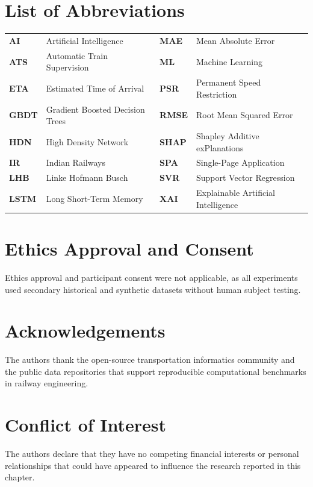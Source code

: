 \documentclass[11pt,a4paper]{article}
\begin{document}
\section*{List of Abbreviations}
\begin{tabular}{llll}
\textbf{AI} & Artificial Intelligence & \textbf{MAE} & Mean Absolute Error \\
\textbf{ATS} & Automatic Train Supervision & \textbf{ML} & Machine Learning \\
\textbf{ETA} & Estimated Time of Arrival & \textbf{PSR} & Permanent Speed Restriction \\
\textbf{GBDT} & Gradient Boosted Decision Trees & \textbf{RMSE} & Root Mean Squared Error \\
\textbf{HDN} & High Density Network & \textbf{SHAP} & Shapley Additive exPlanations \\
\textbf{IR} & Indian Railways & \textbf{SPA} & Single-Page Application \\
\textbf{LHB} & Linke Hofmann Busch & \textbf{SVR} & Support Vector Regression \\
\textbf{LSTM} & Long Short-Term Memory & \textbf{XAI} & Explainable Artificial Intelligence \\
\end{tabular}

\section*{Ethics Approval and Consent}
Ethics approval and participant consent were not applicable, as all experiments used secondary historical and synthetic datasets without human subject testing.

\section*{Acknowledgements}
The authors thank the open-source transportation informatics community and the public data repositories that support reproducible computational benchmarks in railway engineering.

\section*{Conflict of Interest}
The authors declare that they have no competing financial interests or personal relationships that could have appeared to influence the research reported in this chapter.
\end{document}
